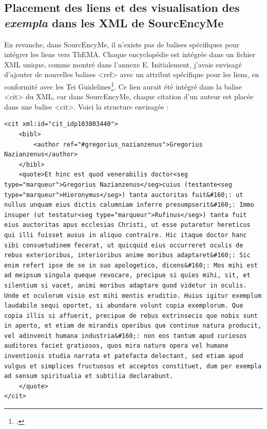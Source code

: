 \subsection{Placement des liens et des visualisation des \textit{exempla} dans les XML de SourcEncyMe}

En revanche, dans SourcEncyMe, il n'existe pas de balises spécifiques pour intégrer les liens vers ThEMA. Chaque encyclopédie est intégrée dans un fichier XML unique, comme montré dans l'annexe E. Initialement, j'avais envisagé d'ajouter de nouvelles balises <ref> avec un attribut spécifique pour les liens, en conformité avec les Tei Guidelines\footcite{17LinkingSegmentation}. Ce lien aurait été intégré dans la balise <cit> du XML, car dans SourcEncyMe, chaque citation d'un auteur est placée dans une balise <cit>. Voici la structure envisagée : \\

\begin{lstlisting}[breaklines=true]
<cit xml:id="cit_idp103803440">
	<bibl>
		<author ref="#gregorius_nazianzenus">Gregorius Nazianzenus</author>
	</bibl>
	<quote>Et hinc est quod venerabilis doctor<seg type="marqueur">Gregorius Nazianzenus</seg>cuius (testante<seg type="marqueur">Hieronymus</seg>) tanta auctoritas fuit&#160;: ut nullus unquam eius dictis calumniam inferre presumpserit&#160;: Immo insuper (ut testatur<seg type="marqueur">Rufinus</seg>) tanta fuit eius auctoritas apus ecclesias Christi, ut esse putaretur hereticus qui illi fuisset ausus in aliquo contraire. Hic itaque doctor hanc sibi consuetudinem fecerat, ut quicquid eius occurreret oculis de rebus exterioribus, interioribus anime moribus adaptaret&#160;: Sic enim refert ipse de se in suo apologetico, dicens&#160;: Mos mihi est ad meipsum singula queque revocare, precipue si quies mihi, sit, et silentium si vacet, animi moribus adaptare quod videtur in oculis. Unde et oculorum visio est mihi mentis eruditio. Huius igitur exemplum laudabile sequi oportet, si abundare volunt copia exemplorum. Que copia illis si affuerit, precipue de rebus extrinsecis que nobis sunt in aperto, et etiam de mirandis operibus que continue natura producit, vel adinvenit humana industria&#160;: non eos tantum apud curiosos auditores faciet gratiosos, quos mira nature opera vel humane inventionis studia narrata et patefacta delectant, sed etiam apud vulgus et simplices fructuosos et acceptos constituet, dum per exempla ad sensum spiritualia et subtilia declarabunt.
	</quote>
</cit>
\end{lstlisting}

